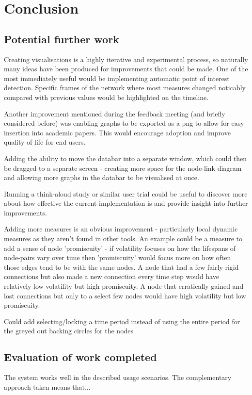 \chapter{Conclusion}

\section{Potential further work} 
Creating visualisations is a highly iterative and experimental process, so naturally many ideas have been produced for improvements that could be made. 
One of the most immediately useful would be implementing automatic point of interest detection. Specific frames of the network where most measures changed noticably compared with previous values would be highlighted on the timeline.
\newline

Another improvement mentioned during the feedback meeting (and briefly considered before) was enabling graphs to be exported as a png to allow for easy insertion into academic papers. This would encourage adoption and improve quality of life for end users.
\newline

Adding the ability to move the databar into a separate window, which could then be dragged to a separate screen - creating more space for the node-link diagram and allowing more graphs in the databar to be visualised at once. 
\newline

Running a think-aloud study or similar user trial could be useful to discover more about how effective the current implementation is and provide insight into further improvements.
\newline

Adding more measures is an obvious improvement - particularly local dynamic measures as they aren't found in other tools. An example could be a measure to add a sense of node 'promiscuity' - if volatility focuses on how the lifespans of node-pairs vary over time then 'promiscuity' would focus more on how often those edges tend to be with the same nodes. A node that had a few fairly rigid connections but also made a new connection every time step would have relatively low volatility but high promiscuity. A node that erratically gained and lost connections but only to a select few nodes would have high volatility but low promiscuity.

Could add selecting/locking a time period instead of using the entire period for the greyed out backing circles for the nodes

\section{Evaluation of work completed} 
The system works well in the described usage scenarios. The complementary approach taken means that...
